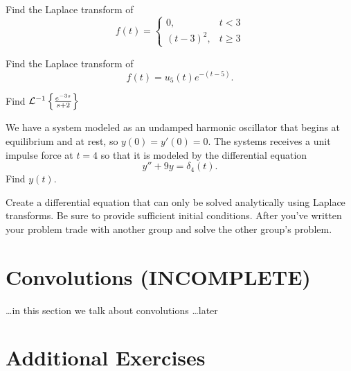 \begin{problem}
    Find the Laplace transform of
    \[ f(t) = \left\{ \begin{array}{cc} 0, & t < 3 \\ (t-3)^2, & t \ge 3 \end{array} \right.
    \]
\end{problem}

\begin{problem}
    Find the Laplace transform of
    \[ f(t) = u_5(t) e^{-(t-5)}. \]
\end{problem}
\solution{
    \[ \lap{u_5(t) e^{-(t-5)}} = \frac{e^{-5s}}{s+1} \]
}

\begin{problem}
    Find $\mathcal{L}^{-1}\left\{ \frac{e^{-3s}}{s+2} \right\}$
\end{problem}
\solution{
    \[ \lapinv{\frac{e^{-3s}}{s+2}} = u_3(t) e^{-2(t-3)} \]
}



\begin{problem}
    We have a system modeled as an undamped harmonic oscillator that begins at equilibrium
    and at rest, so $y(0) = y'(0) = 0$.  The systems receives a unit impulse force at $t=4$ so
    that it is modeled by the differential equation
    \[ y'' + 9y = \delta_4(t). \]
    Find $y(t)$.
\end{problem}
\solution{
    \[ y(t) = u_4(t) \sin(3(t-4)). \]
}

\begin{problem}
    Create a differential equation that can only be solved analytically using Laplace
    transforms.  Be sure to provide sufficient initial conditions.  After you've written
    your problem trade with another group and solve the other group's problem.
\end{problem}


\newpage\section{Convolutions (INCOMPLETE)}
\ldots in this section we talk about convolutions \ldots later



\newpage\section{Additional Exercises}



